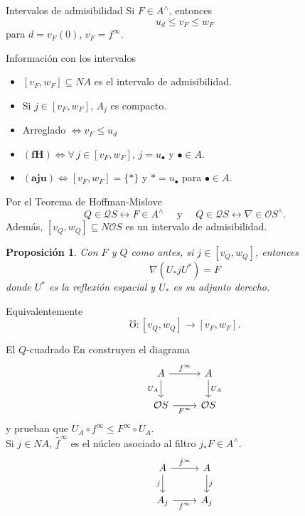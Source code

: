 \documentclass[compress,12pt]{beamer}
\newtheorem{prop}{Proposición}
\begin{document}
\begin{frame}{Intervalos de admisibilidad}
Si $F\in A^\wedge$, entonces 
\[
u_d\leq v_F \leq  w_F
\] 
para $d=v_F(0)$, $v_F=f^\infty$.

\begin{block}{Información con los intervalos}
\begin{itemize}
\item $[v_F, w_F]\subseteq NA$ es el intervalo de admisibilidad.
\item Si $j\in [v_F,w_F]$, $A_j$ es compacto.
\item Arreglado $\Leftrightarrow v_F\leq u_d$
\item $\mathbf{(fH)}\Leftrightarrow\forall\, j\in [v_F,w_F]$, $j=u_\bullet$ y $\bullet\in A$.  
\item $\mathbf{(aju)}\Leftrightarrow [v_F,w_F]=\{*\}$ y $*=u_\bullet$ para $\bullet\in A$. 
\end{itemize}
\end{block}
\end{frame}

\begin{frame}
Por el Teorema de Hoffman-Mislove 
\[
Q\in \mathcal{Q}S\leftrightarrow F\in A^\wedge\quad \mbox{ y } \quad Q\in \mathcal{Q}S\leftrightarrow \nabla\in \mathcal{O}S^\wedge.
\]
Además, $[v_Q, w_Q]\subseteq N\mathcal{O}S$ es un intervalo de admisibilidad.

\begin{prop}
Con $F$ y $Q$ como antes, si $j\in [v_Q, w_Q]$, entonces 
\[
\nabla(U_*jU^*)=F
\]
donde $U^*$ es la reflexión espacial y $U_*$ es su adjunto derecho.
\end{prop}
Equivalentemente
\[
\mho\colon [v_Q, w_Q]\to [v_F, w_F].
\]
\end{frame}

\begin{frame}[fragile]{El $Q$-cuadrado}
En \cite{H.S.V} construyen el diagrama
\[\begin{tikzcd}
	A & A \\
	{\mathcal{O}S} & {\mathcal{O}S}
	\arrow["{f^\infty}", from=1-1, to=1-2]
	\arrow["{U_A}"', from=1-1, to=2-1]
	\arrow["{U_A}", from=1-2, to=2-2]
	\arrow["{F^\infty}"', from=2-1, to=2-2]
\end{tikzcd}\]
y prueban que $U_A\circ f^\infty\leq F^\infty \circ U_A$.\\
	
Si $j\in NA$, $\hat{f}^\infty$ es el núcleo asociado al filtro $j_*F\in A^\wedge$.
\[\begin{tikzcd}
	A & A \\
	{A_j} & {A_j}
	\arrow["{\hat{f}^\infty}", from=1-1, to=1-2]
	\arrow["{j}"', from=1-1, to=2-1]
	\arrow["{j}", from=1-2, to=2-2]
	\arrow["{f^\infty}"', from=2-1, to=2-2]
\end{tikzcd}\]
\end{frame}
\end{document}
